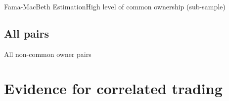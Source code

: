 \documentclass[handout]{beamer}
\begin{document}
%
		
		
\begin{frame}{Fama-MacBeth Estimation}{High level of common ownership (sub-sample)}
\label{Monthly9} 

\begin{table}[htbp]
	\centering
	\resizebox{0.8\textwidth}{!}{
		
	}
\end{table}	
	\end{frame}

\subsection{All pairs}


\begin{frame}{All non-common owner pairs}
	\begin{table}[htbp]
		\centering
		\resizebox{1\textwidth}{!}{
			
		}
	\end{table}
\end{frame}


	
	
	\section{Evidence for correlated trading}
\end{document}
